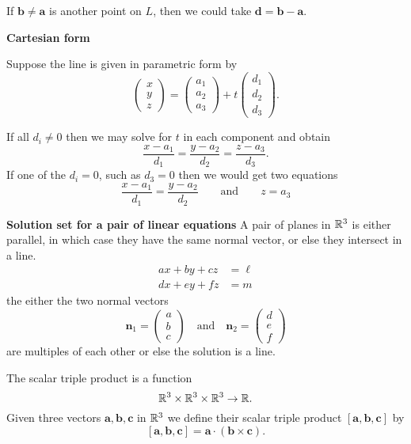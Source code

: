 \documentclass[10pt, a4paper]{article}
\newcommand{\mbf}[1]{\mathbf{#1}}
\begin{document}
If $\mbf{b \neq a}$ is another point on $L$, then we could take $\mbf{d = b - a}$.

\textbf{Cartesian form}

Suppose the line is given in parametric form by
\[
\begin{pmatrix}
    x \\ y \\ z
\end{pmatrix}
=
\begin{pmatrix}
    a_1 \\ a_2 \\ a_3
\end{pmatrix}
+
t\begin{pmatrix}
    d_1 \\ d_2 \\ d_3
\end{pmatrix}.
\]

If all $d_i \neq 0$ then we may solve for $t$ in each component and obtain
\[
\frac{x - a_1}{d_1} = \frac{y - a_2}{d_2} = \frac{z - a_3}{d_3}.
\]
If one of the $d_i = 0$, such as $d_3 = 0$ then we would get two equations
\[
\frac{x - a_1}{d_1} = \frac{y - a_2}{d_2}\qquad\text{and}\qquad z = a_3
\]

\textbf{Solution set for a pair of linear equations}
A pair of planes in $\mathbb{R} ^ 3$ is either parallel, in which case they have the same normal vector, or else they intersect in a line.
\begin{align*}
    ax + by + cz &= \ell \\
    dx + ey + fz &= m
\end{align*}
the either the two normal vectors
\[
\mbf{n}_1 = \begin{pmatrix} a \\ b \\ c \end{pmatrix}\quad\text{and}\quad\mbf{n}_2 = \begin{pmatrix} d \\ e \\ f \end{pmatrix}
\]
are multiples of each other or else the solution is a line.

\begin{definition}
    The scalar triple product is a function
    \[
    \mathbb{R} ^ 3 \times \mathbb{R} ^ 3 \times \mathbb{R} ^ 3 \rightarrow \mathbb{R}.
    \]
    Given three vectors $\mbf{a, b, c}$ in $\mathbb{R} ^ 3$ we define their scalar triple product $[\mbf{a, b, c}]$ by
    \[
    [\mbf{a, b, c}] = \mbf{a} \cdot(\mbf{b} \times \mbf{c}).
    \]
\end{definition}
\end{document}
